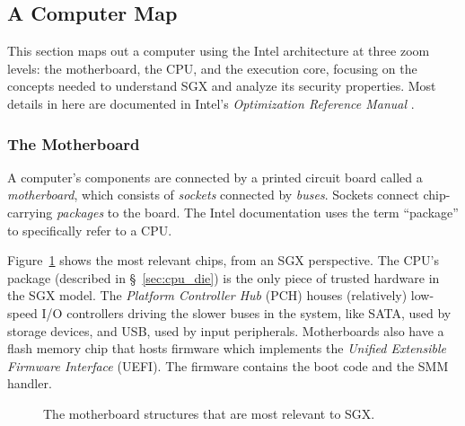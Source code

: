 \subsection{A Computer Map}

This section maps out a computer using the Intel architecture at three zoom
levels: the motherboard, the CPU, and the execution core, focusing on the
concepts needed to understand SGX and analyze its security properties. Most
details in here are documented in Intel's
\textit{Optimization Reference Manual} \cite{intel2014optimization}.


\subsubsection{The Motherboard}
\label{sec:motherboard}

A computer's components are connected by a printed circuit board called a
\textit{motherboard}, which consists of \textit{sockets} connected by
\textit{buses}. Sockets connect chip-carrying \textit{packages} to the board.
The Intel documentation uses the term ``package'' to specifically refer to a
CPU.

Figure~\ref{fig:motherboard} shows the most relevant chips, from an SGX
perspective. The CPU's package (described in \S~\ref{sec:cpu_die}) is the only
piece of trusted hardware in the SGX model. The \textit{Platform Controller
Hub} (PCH) houses (relatively) low-speed I/O controllers driving the slower
buses in the system, like SATA, used by storage devices, and USB, used by
input peripherals.  Motherboards also have a flash memory chip that hosts
firmware which implements the \textit{Unified Extensible Firmware Interface}
(UEFI). The firmware contains the boot code and the SMM handler.

\begin{figure}[hbt]
  \caption{
    The motherboard structures that are most relevant to SGX.
  }
  \label{fig:motherboard}
\end{figure}

